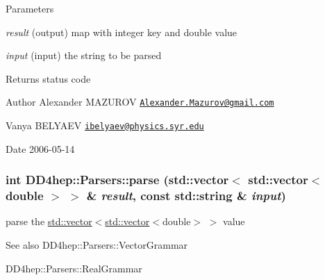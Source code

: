 \begin{DoxyParams}{Parameters}
\item[{\em result}](output) map with integer key and double value \item[{\em input}](input) the string to be parsed \end{DoxyParams}
\begin{DoxyReturn}{Returns}
status code
\end{DoxyReturn}
\begin{DoxyAuthor}{Author}
Alexander MAZUROV \href{mailto:Alexander.Mazurov@gmail.com}{\tt Alexander.Mazurov@gmail.com} 

Vanya BELYAEV \href{mailto:ibelyaev@physics.syr.edu}{\tt ibelyaev@physics.syr.edu} 
\end{DoxyAuthor}
\begin{DoxyDate}{Date}
2006-\/05-\/14 
\end{DoxyDate}
\hypertarget{namespace_d_d4hep_1_1_parsers_aaec3e97d2c62b4ca583b113b7c55e44c}{
\subsubsection[{parse}]{\setlength{\rightskip}{0pt plus 5cm}int DD4hep::Parsers::parse (std::vector$<$ std::vector$<$ double $>$ $>$ \& {\em result}, \/  const std::string \& {\em input})}}
\label{namespace_d_d4hep_1_1_parsers_aaec3e97d2c62b4ca583b113b7c55e44c}


parse the {\ttfamily \hyperlink{classstd_1_1vector}{std::vector}$<$\hyperlink{classstd_1_1vector}{std::vector}$<$double$>$ $>$} value \begin{DoxySeeAlso}{See also}
DD4hep::Parsers::VectorGrammar 

DD4hep::Parsers::RealGrammar 
\end{DoxySeeAlso}

